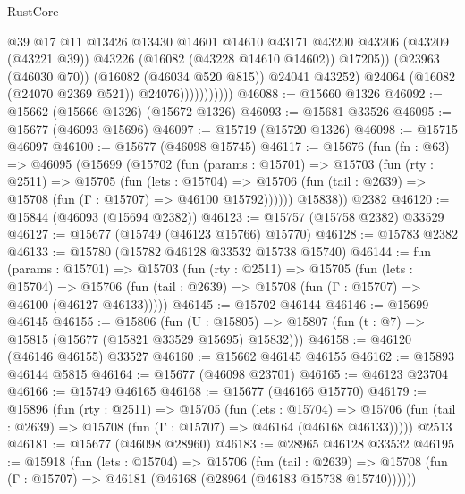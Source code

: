 \begin{lexlean}{RustCore}
\begin{coremodule}
                                @39
                                @17
                                @11
                                @13426
                                @13430
                                @14601
                                @14610
                                @43171
                                @43200
                                @43206
                                (@43209 (@43221 @39))
                                @43226
                                (@16082 (@43228 @14610 @14602))
                                @17205))
                            (@23963 (@46030 @70))
                            (@16082 (@46034 @520 @815))
                            @24041
                            @43252)
                          @24064
                          (@16082 (@24070 @2369 @521))
                          @24076)))))))))))
@46088 := @15660 @1326
@46092 := @15662 (@15666 @1326) (@15672 @1326)
@46093 := @15681 @33526
@46095 := @15677 (@46093 @15696)
@46097 := @15719 (@15720 @1326)
@46098 := @15715 @46097
@46100 := @15677 (@46098 @15745)
@46117 := @15676
    (fun (fn : @63) =>
    @46095
      (@15699
        (@15702
          (fun (params : @15701) =>
          @15703
            (fun (rty : @2511) =>
            @15705
              (fun (lets : @15704) =>
              @15706 (fun (tail : @2639) => @15708 (fun (Γ : @15707) => @46100 @15792))))))
        @15838))
    @2382
@46120 := @15844 (@46093 (@15694 @2382))
@46123 := @15757 (@15758 @2382) @33529
@46127 := @15677 (@15749 (@46123 @15766) @15770)
@46128 := @15783 @2382
@46133 := @15780 (@15782 @46128 @33532 @15738 @15740)
@46144 := fun (params : @15701) =>
  @15703
    (fun (rty : @2511) =>
    @15705
      (fun (lets : @15704) =>
      @15706 (fun (tail : @2639) => @15708 (fun (Γ : @15707) => @46100 (@46127 @46133)))))
@46145 := @15702 @46144
@46146 := @15699 @46145
@46155 := @15806
    (fun (U : @15805) => @15807 (fun (t : @7) => @15815 (@15677 (@15821 @33529 @15695) @15832)))
@46158 := @46120 (@46146 @46155) @33527
@46160 := @15662 @46145 @46155
@46162 := @15893 @46144 @5815
@46164 := @15677 (@46098 @23701)
@46165 := @46123 @23704
@46166 := @15749 @46165
@46168 := @15677 (@46166 @15770)
@46179 := @15896
    (fun (rty : @2511) =>
    @15705
      (fun (lets : @15704) =>
      @15706 (fun (tail : @2639) => @15708 (fun (Γ : @15707) => @46164 (@46168 @46133)))))
    @2513
@46181 := @15677 (@46098 @28960)
@46183 := @28965 @46128 @33532
@46195 := @15918
    (fun (lets : @15704) =>
    @15706
      (fun (tail : @2639) =>
      @15708 (fun (Γ : @15707) => @46181 (@46168 (@28964 (@46183 @15738 @15740))))))

\end{coremodule}
\end{lexlean}
